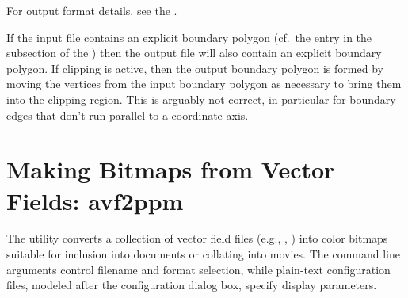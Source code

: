 For output format details, see the .


If the input file contains an explicit boundary polygon (cf.\ the
 entry in the  subsection of the {}) then the
output file will also contain an explicit boundary polygon.  If clipping
is active, then the output boundary polygon is formed by moving the
vertices from the input boundary polygon as necessary to bring them into
the clipping region.  This is arguably not correct, in particular for
boundary edges that don't run parallel to a coordinate axis.



\section{Making Bitmaps from Vector Fields:
            avf2ppm}\label{sec:avf2ppm}%
%

The  utility converts a
collection of vector field files (e.g., , ) into color
bitmaps suitable for inclusion into documents or collating into movies.
The command line arguments control filename and format selection, while
plain-text configuration files, modeled after the
{} configuration dialog
box, specify display parameters.

